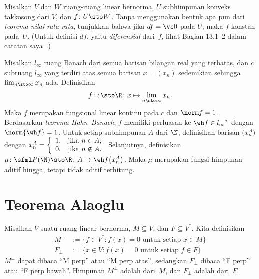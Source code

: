 \begin{exer} Misalkan $V$ dan $W$ ruang-ruang linear bernorma, $U$ subhimpunan konveks takkosong dari $V$,
dan $f \colon U \sto W$.  Tanpa menggunakan bentuk apa pun dari \emph{teorema nilai rata-rata}, tunjukkan
bahwa jika $df = \vc 0$ pada $U$, maka $f$ konstan pada~$U$.  (Untuk definisi $df$, yaitu
\emph{diferensial} dari~$f$, lihat Bagian 13.1--2 dalam catatan saya~\cite{Erdman:2007}.)
\end{exer}

\begin{exam}\label{C067181} Misalkan $l_\infty$ ruang Banach dari semua barisan bilangan
real yang terbatas, dan $c$ subruang $l_\infty$ yang terdiri atas semua barisan $x = (x_n)$
sedemikian sehingga $\lim_{n \sto \infty} x_n$ ada. Definisikan
  \[ f\colon c \sto \R\colon x \mapsto \lim_{n\sto \infty} x_n. \]
Maka $f$ merupakan fungsional linear kontinu pada $c$ dan $\norm f = 1$.  Berdasarkan
\emph{teorema Hahn--Banach}, $f$ memiliki perluasan ke $\wh f \in {l_\infty}^*$ dengan
$\norm{\wh f} = 1$. Untuk setiap
subhimpunan $A$ dari $\N$, definisikan barisan $\bigl(x^A_n\bigr)$ dengan $x^A_n = \left\{%
\begin{array}{ll}
    1, & \hbox{jika $n \in A$;} \\
    0, & \hbox{jika $n \notin A$.} \\
\end{array}%
\right.$ Selanjutnya, definisikan $ \mu\colon \sfml P(\N) \sto \R \colon A \mapsto \wh
f\bigl(x^A_n\bigr)$. Maka $\mu$ merupakan fungsi himpunan aditif hingga, tetapi tidak aditif
terhitung.
\end{exam}













\section{Teorema Alaoglu}
\begin{notn} Misalkan $V$ suatu ruang linear bernorma, $M \subseteq V$, dan $F \subseteq V^\ast$.
Kita definisikan
 \begin{align*}
         M^\perp &:= \{f \in V^*\colon f(x)=0 \text{ untuk setiap $x \in M$}\} \\
         F_\perp &:= \{x \in V\colon f(x)=0 \text{ untuk setiap $f \in F$}\}
  \end{align*}
$M^\perp$ dapat dibaca ``M perp'' atau ``M perp atas'', sedangkan $F_\perp$ dibaca ``F perp'' atau ``F perp bawah''.
Himpunan $M^\perp$ adalah
 dari~$M$, dan $F_\perp$ adalah
 dari~$F$.
\end{notn}

